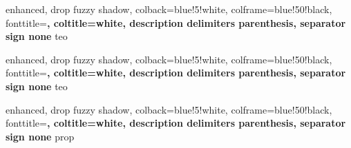 \usepackage[usenames,dvipsnames,svgnames]{xcolor}
\usepackage{graphicx}
\usepackage{epsfig}
\usepackage{pgf,tikz}
\usetikzlibrary{calc,decorations.pathreplacing}
\usepackage{tkz-euclide}

\usepackage[utf8]{inputenc}
\usepackage[brazil]{babel}

\usepackage{pythontex}

\usepackage{amsfonts,mathtools,amsthm,amssymb}
\usepackage{stmaryrd}

\usepackage{fancyhdr}
\usepackage{makeidx}
\usepackage{enumerate}
\usepackage{wrapfig}
\usepackage{xspace,setspace}
\usepackage[rm]{titlesec}
\usepackage[hmargin=1cm,vmargin=1.5cm]{geometry}
\usepackage{tabu}
\usepackage{multicol}
\usepackage{ccicons}
\usepackage{makecell}
\usepackage[nodayofweek]{datetime}

\usepackage[many]{tcolorbox}

\usepackage{hyperref}
\hypersetup{
    colorlinks = true,
    urlcolor   = cyan,
    linkcolor  = red,
    citecolor  = blue
}
\usepackage{bookmark}
\usepackage{coffeestains}

\usepackage[
type={CC},
modifier={by-nc},
version={4.0},
lang={brazilian},
]{doclicense}



\renewcommand{\baselinestretch}{1.2}
\allowdisplaybreaks
\makeindex

%
{
    enhanced,
    drop fuzzy shadow,
    colback=blue!5!white,
    colframe=blue!50!black,
    fonttitle=\bfseries,
    coltitle=white,
    description delimiters parenthesis,
    separator sign none
}{teo}

%
{
    enhanced,
    drop fuzzy shadow,
    colback=blue!5!white,
    colframe=blue!50!black,
    fonttitle=\bfseries,
    coltitle=white,
    description delimiters parenthesis,
    separator sign none
}{teo}



%
{
    enhanced,
    drop fuzzy shadow,
    colback=blue!5!white,
    colframe=blue!50!black,
    fonttitle=\bfseries,
    coltitle=white,
    description delimiters parenthesis,
    separator sign none
}{prop}


